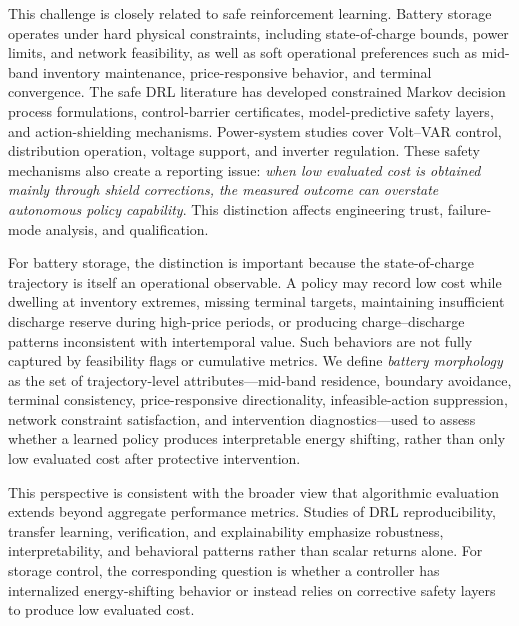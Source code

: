 This challenge is closely related to safe reinforcement learning. Battery storage operates under hard physical constraints, including state-of-charge bounds, power limits, and network feasibility, as well as soft operational preferences such as mid-band inventory maintenance, price-responsive behavior, and terminal convergence. The safe DRL literature has developed constrained Markov decision process formulations\cite{achiam2017cpo}, control-barrier certificates\cite{brunke2022safeLearning}, model-predictive safety layers\cite{odriozola2023shielded}, and action-shielding mechanisms\cite{zhou2023safeRegion,mazumdar2024stopping,misra2024psafe,wang2025shieldedPlanning}. Power-system studies cover Volt--VAR control\cite{wang2020safeVoltVar}, distribution operation\cite{li2022safeDistribution}, voltage support\cite{bi2024safeVoltage}, and inverter regulation\cite{shuai2024safeInverter,omar2025interiorPoint,liu2026digitalTwin}. These safety mechanisms also create a reporting issue: \emph{when low evaluated cost is obtained mainly through shield corrections, the measured outcome can overstate autonomous policy capability}. This distinction affects engineering trust, failure-mode analysis, and qualification.

For battery storage, the distinction is important because the state-of-charge trajectory is itself an operational observable. A policy may record low cost while dwelling at inventory extremes, missing terminal targets, maintaining insufficient discharge reserve during high-price periods, or producing charge--discharge patterns inconsistent with intertemporal value. Such behaviors are not fully captured by feasibility flags or cumulative metrics. We define \emph{battery morphology} as the set of trajectory-level attributes---mid-band residence, boundary avoidance, terminal consistency, price-responsive directionality, infeasible-action suppression, network constraint satisfaction, and intervention diagnostics---used to assess whether a learned policy produces interpretable energy shifting, rather than only low evaluated cost after protective intervention.

This perspective is consistent with the broader view that algorithmic evaluation extends beyond aggregate performance metrics\cite{henderson2018deepRLmatters,agarwal2021statistical}. Studies of DRL reproducibility, transfer learning\cite{padakandla2021dynamicRL,zhu2023transferRL}, verification\cite{landers2023verification}, and explainability\cite{vouros2022xrl,milani2024xrl} emphasize robustness, interpretability, and behavioral patterns rather than scalar returns alone. For storage control, the corresponding question is whether a controller has internalized energy-shifting behavior or instead relies on corrective safety layers to produce low evaluated cost.


